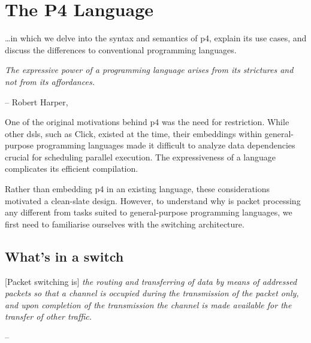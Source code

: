 
\chapter{The P4 Language}

\begin{chapterabstract}
	\dots in which we delve into the syntax and semantics of \acrshort{p4},
	explain its use cases, and discuss the differences to conventional
	programming languages.

	\begin{displayquote}
		\textit{The expressive power of a programming language arises from its
		strictures and \emph{not} from its affordances.}

		-- Robert Harper,  \cite{pfpl1oplss2019}
	\end{displayquote}
\end{chapterabstract}

One of the original motivations behind \acrshort{p4} was the need for
restriction. While other \acrlong{dsl}s, such as Click\cite{kohler2000click},
existed at the time, their embeddings within general-purpose programming
languages made it difficult to analyze data dependencies crucial for scheduling
parallel execution. The expressiveness of a language complicates its efficient
compilation.

Rather than embedding \acrshort{p4} in an existing language, these
considerations motivated a clean-slate design. However, to understand why is
packet processing any different from tasks suited to general-purpose programming
languages, we first need to familiarise ourselves with the switching
architecture.

\section{What's in a switch}

\begin{displayquote}
	{[Packet switching is]} \emph{the routing and transferring of data by means
	of addressed packets so that a channel is occupied during the transmission
	of the packet only, and upon completion of the transmission the channel is
	made available for the transfer of other traffic.}

	--  \cite{weik2012fiber}
\end{displayquote}

